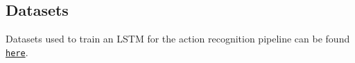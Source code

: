 \subsection*{Datasets}

Datasets used to train an L\+S\+TM for the action recognition pipeline can be found \href{https://github.com/robotology/assistive-rehab-storage}{\tt here}. 